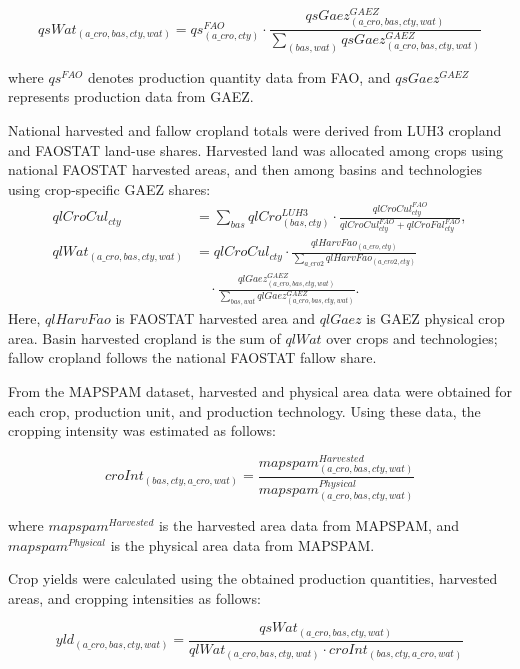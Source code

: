 \begin{equation}
qsWat_{(a\_cro,bas,cty,wat)} =
qs^{FAO}_{(a\_cro,cty)} \cdot
\frac{qsGaez^{GAEZ}_{(a\_cro,bas,cty,wat)}}{\sum_{(bas,wat)} qsGaez^{GAEZ}_{(a\_cro,bas,cty,wat)}}
\end{equation}

where \( qs^{FAO} \) denotes production quantity data from FAO,
and \( qsGaez^{GAEZ} \) represents production data from GAEZ.

National harvested and fallow cropland totals were derived from LUH3 cropland and FAOSTAT land-use shares. Harvested land was allocated among crops using national FAOSTAT harvested areas, and then among basins and technologies using crop-specific GAEZ shares:
\begin{align}
qlCroCul_{cty}
&=\sum_{bas}qlCro^{LUH3}_{(bas,cty)}
\cdot\frac{qlCroCul^{FAO}_{cty}}{qlCroCul^{FAO}_{cty}+qlCroFal^{FAO}_{cty}},\\
qlWat_{(a\_cro,bas,cty,wat)}
&=qlCroCul_{cty}
\cdot\frac{qlHarvFao_{(a\_cro,cty)}}{\sum_{a\_cro2}qlHarvFao_{(a\_cro2,cty)}}
\nonumber\\[-0.3em]
&\quad\cdot\frac{qlGaez^{GAEZ}_{(a\_cro,bas,cty,wat)}}
{\sum_{bas,wat}qlGaez^{GAEZ}_{(a\_cro,bas,cty,wat)}}.
\end{align}
Here, \(qlHarvFao\) is FAOSTAT harvested area and \(qlGaez\) is GAEZ physical crop area. Basin harvested cropland is the sum of \(qlWat\) over crops and technologies; fallow cropland follows the national FAOSTAT fallow share.

From the MAPSPAM dataset, harvested and physical area data were obtained for each crop, 
production unit, and production technology. 
Using these data, the cropping intensity was estimated as follows:

\begin{equation}
croInt_{(bas,cty,a\_cro,wat)} =
\frac{mapspam^{Harvested}_{(a\_cro,bas,cty,wat)}}{mapspam^{Physical}_{(a\_cro,bas,cty,wat)}}
\end{equation}

where \( mapspam^{Harvested} \) is the harvested area data from MAPSPAM, and \\
\( mapspam^{Physical} \) is the physical area data from MAPSPAM.

Crop yields were calculated using the obtained production quantities, harvested areas, 
and cropping intensities as follows:

\begin{equation}
yld_{(a\_cro,bas,cty,wat)} =
\frac{qsWat_{(a\_cro,bas,cty,wat)}}{qlWat_{(a\_cro,bas,cty,wat)} \cdot croInt_{(bas,cty,a\_cro,wat)}}
\end{equation}


